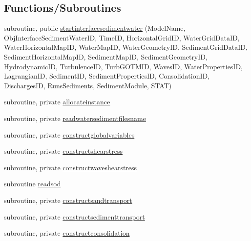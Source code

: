 \subsection*{Functions/\+Subroutines}
\begin{DoxyCompactItemize}
\item 
subroutine, public \mbox{\hyperlink{namespacemoduleinterfacesedimentwater_ac4816996443451e1d6254c032bf000d5}{startinterfacesedimentwater}} (Model\+Name, Obj\+Interface\+Sediment\+Water\+ID, Time\+ID, Horizontal\+Grid\+ID, Water\+Grid\+Data\+ID, Water\+Horizontal\+Map\+ID, Water\+Map\+ID, Water\+Geometry\+ID, Sediment\+Grid\+Data\+ID, Sediment\+Horizontal\+Map\+ID, Sediment\+Map\+ID, Sediment\+Geometry\+ID, Hydrodynamic\+ID, Turbulence\+ID, Turb\+G\+O\+T\+M\+ID, Waves\+ID, Water\+Properties\+ID, Lagrangian\+ID, Sediment\+ID, Sediment\+Properties\+ID, Consolidation\+ID, Discharges\+ID, Runs\+Sediments, Sediment\+Module, S\+T\+AT)
\item 
subroutine, private \mbox{\hyperlink{namespacemoduleinterfacesedimentwater_ab65f957bafcb50f6f38a075ca13833de}{allocateinstance}}
\item 
subroutine, private \mbox{\hyperlink{namespacemoduleinterfacesedimentwater_a11b9e14e9187da0c2c8bc38302ec8e95}{readwatersedimentfilesname}}
\item 
subroutine, private \mbox{\hyperlink{namespacemoduleinterfacesedimentwater_a6f12890d7a3c41413a03f74cc366bd1a}{constructglobalvariables}}
\item 
subroutine, private \mbox{\hyperlink{namespacemoduleinterfacesedimentwater_afdce65eb974d56a59cfb4d3ba2145d99}{constructshearstress}}
\item 
subroutine, private \mbox{\hyperlink{namespacemoduleinterfacesedimentwater_a068eb47dacf7b4047f132db2a3fd8022}{constructwaveshearstress}}
\item 
subroutine \mbox{\hyperlink{namespacemoduleinterfacesedimentwater_a86923875b20b0ddacafa24243a465222}{readsod}}
\item 
subroutine, private \mbox{\hyperlink{namespacemoduleinterfacesedimentwater_a73bbb1dff0427c5f11a6ca3dce2ac6fb}{constructsandtransport}}
\item 
subroutine, private \mbox{\hyperlink{namespacemoduleinterfacesedimentwater_aa1f362c776321b794b1a5798a7a557d7}{constructsedimenttransport}}
\item 
subroutine, private \mbox{\hyperlink{namespacemoduleinterfacesedimentwater_af0c8cd28e080ee63fe3573266a390d33}{constructconsolidation}}
\item 

\end{DoxyCompactItemize}
